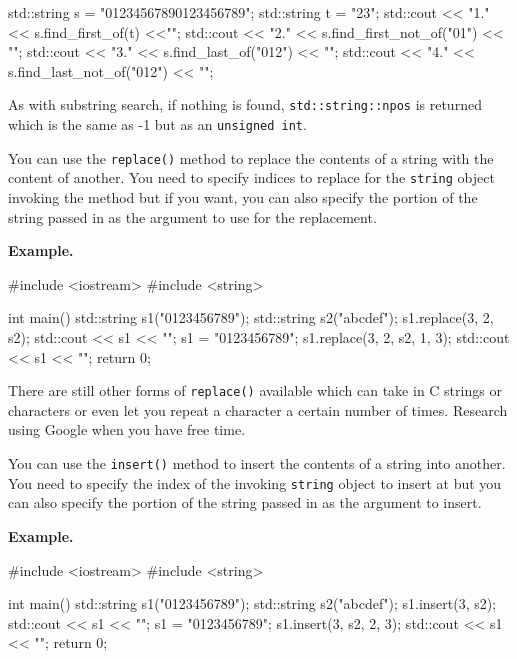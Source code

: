 \begin{console}
std::string s = "01234567890123456789";
std::string t = "23";
std::cout << "1." << s.find_first_of(t) <<"\n";
std::cout << "2." << s.find_first_not_of("01") << "\n";
std::cout << "3." << s.find_last_of("012") << "\n";
std::cout << "4." << s.find_last_not_of("012") << "\n";
\end{console}

As with substring search, if nothing is found, \texttt{std::string::npos}
is returned which is the same as -1 but as an \texttt{unsigned int}.

\newpage{}

You can use the \texttt{replace()} method to replace the contents of a
string with the content of another. You need to specify indices to
replace for the \texttt{string} object invoking the method but if you
want, you can also specify the portion of the string passed in as the
argument to use for the replacement.

\textbf{Example.}

\begin{console}
#include <iostream>
#include <string>

int main()
{   
    std::string s1("0123456789");
    std::string s2("abcdef");
    s1.replace(3, 2, s2);
    std::cout << s1 << "\n";
    s1 = "0123456789";
    s1.replace(3, 2, s2, 1, 3);
    std::cout << s1 << "\n";
    return 0;
} 
\end{console}

There are still other forms of \texttt{replace()} available which can take
in C strings or characters or even let you repeat a character a certain
number of times. Research using Google when you have free time.

\newpage{}

You can use the \texttt{insert()} method to insert the contents of a
string into another. You need to specify the index of the invoking
\texttt{string} object to insert at but you can also specify the portion
of the string passed in as the argument to insert.

\textbf{Example.}

\begin{console}
#include <iostream>
#include <string>

int main()
{   
    std::string s1("0123456789");
    std::string s2("abcdef");
    s1.insert(3, s2);
    std::cout << s1 << "\n";
    s1 = "0123456789";
    s1.insert(3, s2, 2, 3);
    std::cout << s1 << "\n";
    return 0;
} 
\end{console}

